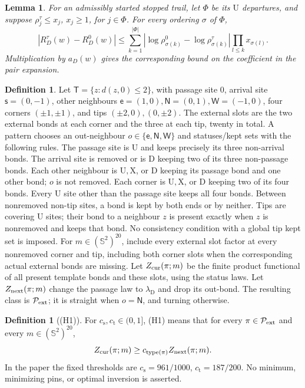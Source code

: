 \documentclass[11pt,reqno]{amsart}
\newtheorem{lemma}[theorem]{Lemma}
\theoremstyle{definition}
\newtheorem{definition}[theorem]{Definition}
\theoremstyle{remark}
\begin{document}
\begin{lemma}\label{l:exposure}
For an admissibly started stopped trail, let \(\Phi\) be its
\(\mathrm U\) departures, and suppose \(\rho_j^\tau\le x_j\),
\(x_j\ge1\), for \(j\in\Phi\).
For every ordering \(\sigma\) of \(\Phi\),
\[
 |R_D^\tau(w)-R_D^0(w)|
 \le\sum_{k=1}^{|\Phi|}
       |\log\rho_{\sigma(k)}^0-\log\rho_{\sigma(k)}^\tau|
                         \prod_{l\le k}x_{\sigma(l)}.
\]
Multiplication by \(a_D(w)\) gives the corresponding bound on the
coefficient in the pair expansion.
\end{lemma}

\begin{definition}\label{d:pattern}
Let \(\mathsf T=\{z:d(z,0)\le2\}\), with passage site \(0\),
arrival site \(\mathsf s=(0,-1)\), other neighbours
\(\mathsf e=(1,0),\mathsf N=(0,1),\mathsf W=(-1,0)\),
four corners \((\pm1,\pm1)\), and tips \((\pm2,0),(0,\pm2)\).
The external slots are the two external bonds at each corner and
the three at each tip, twenty in total.
A pattern chooses an out-neighbour \(o\in\{\mathsf e,\mathsf N,\mathsf W\}\)
and statuses/kept sets with the following rules.
The passage site is \(\mathrm U\) and keeps precisely its three
non-arrival bonds. The arrival site is removed or is \(\mathrm D\)
keeping two of its three non-passage bonds.
Each other neighbour is \(\mathrm U,\mathrm X\), or \(\mathrm D\)
keeping its passage bond and one other bond; \(o\) is not removed.
Each corner is \(\mathrm U,\mathrm X\), or \(\mathrm D\) keeping
two of its four bonds. Every \(\mathrm U\) site other than the
passage site keeps all four bonds.
Between nonremoved non-tip sites, a bond is kept by both ends or
by neither. Tips are covering \(\mathrm U\) sites; their bond to
a neighbour \(z\) is present exactly when \(z\) is nonremoved and
keeps that bond. No consistency condition with a global tip kept
set is imposed.
For \(m\in(\mathbb S^2)^{20}\), include every external slot factor
at every nonremoved corner and tip, including both corner slots
when the corresponding actual external bonds are missing.
Let \(Z_{\rm cur}(\pi;m)\) be the finite product functional of
all present template bonds and these slots, using the status laws.
Let \(Z_{\rm next}(\pi;m)\) change the passage law to
\(\lambda_{\mathrm D}\) and drop its out-bond.
The resulting class is \(\mathcal P_{\rm ext}\); it is straight
when \(o=\mathsf N\), and turning otherwise.
\end{definition}

\begin{definition}[(H1)]\label{h:H1}
For \(c_{\mathrm s},c_{\mathrm t}\in(0,1]\), (H1) means that
for every \(\pi\in\mathcal P_{\rm ext}\) and every
\(m\in(\mathbb S^2)^{20}\),
\[
 Z_{\rm cur}(\pi;m)\ge c_{\rm type(\pi)}Z_{\rm next}(\pi;m).
\]
In the paper the fixed thresholds are
\(c_{\mathrm s}=961/1000\), \(c_{\mathrm t}=187/200\).
No minimum, minimizing pins, or optimal inversion is asserted.
\end{definition}
\end{document}
